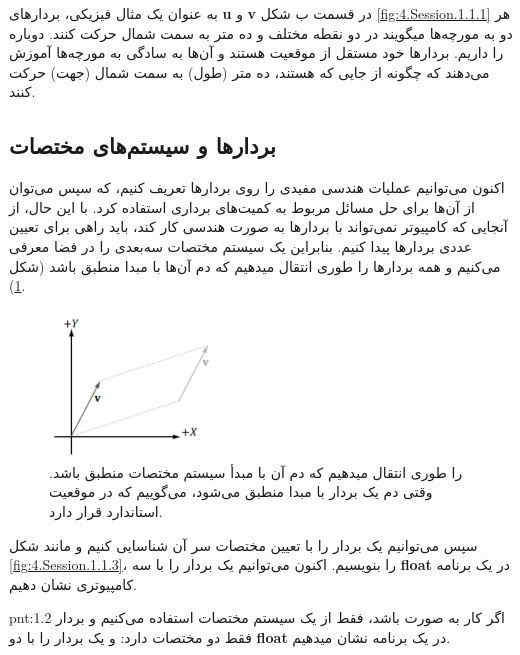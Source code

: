 {\begin{spacing}{1.4}
        به عنوان یک مثال فیزیکی، بردارهای \textbf{u} و \textbf{v} در قسمت ب شکل \ref{fig:4.Session.1.1.1} هر دو به مورچه‌ها میگویند در دو نقطه مختلف  و  ده متر به سمت شمال حرکت کنند.
        دوباره  را داریم.
        بردارها خود مستقل از موقعیت هستند و
        آن‌ها به سادگی به مورچه‌ها آموزش می‌دهند که چگونه از جایی که هستند، ده متر (طول) به سمت شمال (جهت) حرکت کنند.

    \end{spacing}
}

\subsection{\textbf{بردارها و سیستم‌های مختصات}}
\label{subsec:1.1.1}
{
    \Large
    \begin{spacing}{1.5}
        اکنون می‌توانیم عملیات هندسی مفیدی را روی بردارها تعریف کنیم، که سپس می‌توان از آن‌ها برای حل مسائل مربوط به کمیت‌های برداری استفاده کرد.
        با این حال، از آنجایی که کامپیوتر نمی‌تواند با بردارها به صورت هندسی کار کند، باید راهی برای تعیین عددی بردارها پیدا کنیم.
        بنابراین یک سیستم مختصات سه‌بعدی را در فضا معرفی می‌کنیم و همه بردارها را طوری انتقال میدهیم که دم آن‌ها با مبدا منطبق باشد (شکل \ref{fig:4.Session.1.1.2}).

        \begin{figure}[H]
            \centering
            \setlength{\belowcaptionskip}{-10pt}
            \includegraphics[width=0.48\textwidth]{Images/4/1/4.Session.1.1.2}
            \caption{ را طوری انتقال میدهیم که دم آن با مبدأ سیستم مختصات منطبق
            باشد. وقتی دم یک بردار با مبدا منطبق می‌شود، می‌گوییم که در موقعیت استاندارد قرار دارد.}
            \label{fig:4.Session.1.1.2}
        \end{figure}

        سپس می‌توانیم یک بردار را با تعیین مختصات سر آن شناسایی کنیم و مانند شکل \ref{fig:4.Session.1.1.3}،  را بنویسیم.
        اکنون می‌توانیم یک بردار را با سه \textbf{float} در یک برنامه کامپیوتری نشان دهیم.
        \textbf{\vspace{-10pt}}
        \begin{point}{pnt:1.2}
            \Large
            اگر کار به صورت  باشد، فقط از یک سیستم مختصات  استفاده می‌کنیم و بردار فقط دو مختصات دارد:
             و یک بردار را با دو \textbf{float} در یک برنامه نشان میدهیم.
        \end{point}


\end{spacing}}
